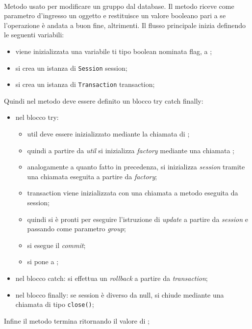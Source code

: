 \begin{description}
	\item{}\\
	Metodo usato per modificare un gruppo dal database. Il metodo riceve come parametro d'ingresso un oggetto  e restituisce un valore booleano  pari a  se l'operazione è andata a buon fine,  altrimenti. Il flusso principale inizia definendo le seguenti variabili:
	\begin{itemize}
		\item viene inizializzata una variabile ti tipo boolean nominata flag, a ;
		\item si crea un istanza di \texttt{Session} session;
		\item si crea un istanza di \texttt{Transaction} transaction;
	\end{itemize}
	Quindi nel metodo deve essere definito un blocco try catch finally:
	\begin{itemize}
		\item nel blocco try:
		\begin{itemize}
			\item util deve essere inizializzato mediante la chiamata  di ;
			\item quindi a partire da \textit{util} si inizializza \textit{factory} mediante una chiamata ;
			\item analogamente a quanto fatto in precedenza, si inizializza \textit{session} tramite una chiamata  eseguita a partire da \textit{factory};
			\item transaction viene inizializzata con una chiamata a metodo  eseguita da session;
			\item quindi si è pronti per eseguire l'istruzione di \textit{update} a partire da \textit{session} e passando come parametro \textit{group};
			\item si esegue il \textit{commit};
			\item si pone  a ;
		\end{itemize}
		\item nel blocco catch: si effettua un \textit{rollback} a partire da \textit{transaction};
		\item nel blocco finally: se session è diverso da null, si chiude mediante una chiamata di tipo \texttt{close()};
	\end{itemize}
	Infine il metodo termina ritornando il valore di ;	
	

\end{description}
